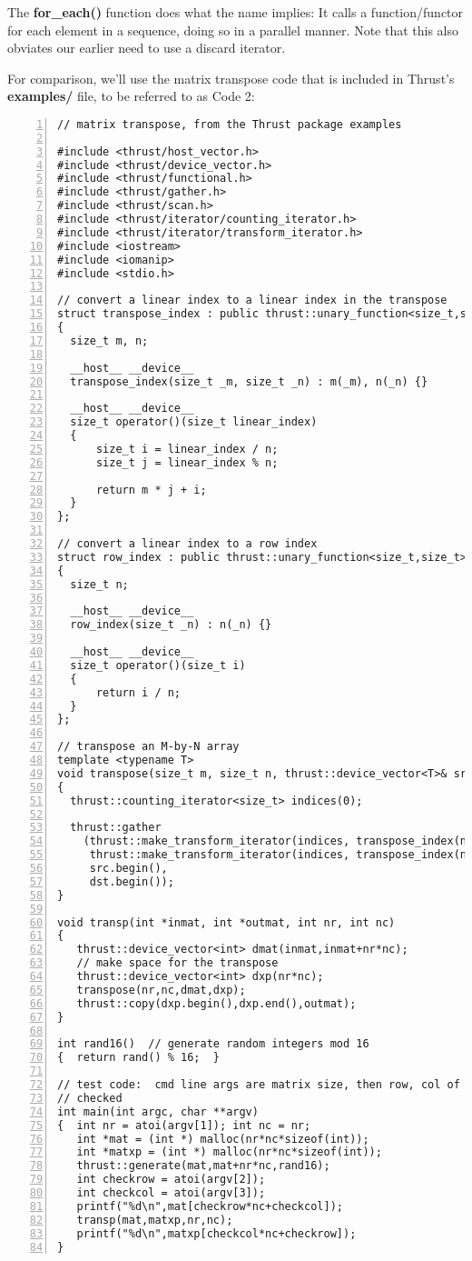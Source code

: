 The {\bf for\_each()} function does what the name implies:  It calls a
function/functor for each element in a sequence, doing so in a parallel
manner.  Note that this also obviates our earlier need to use a discard
iterator.

For comparison, we'll use the matrix transpose code that is included in
Thrust's  {\bf examples/} file, to be referred to as Code 2:

\begin{lstlisting}[numbers=left]
// matrix transpose, from the Thrust package examples

#include <thrust/host_vector.h>
#include <thrust/device_vector.h>
#include <thrust/functional.h>
#include <thrust/gather.h>
#include <thrust/scan.h>
#include <thrust/iterator/counting_iterator.h>
#include <thrust/iterator/transform_iterator.h>
#include <iostream>
#include <iomanip>
#include <stdio.h>

// convert a linear index to a linear index in the transpose 
struct transpose_index : public thrust::unary_function<size_t,size_t>
{
  size_t m, n;

  __host__ __device__
  transpose_index(size_t _m, size_t _n) : m(_m), n(_n) {}

  __host__ __device__
  size_t operator()(size_t linear_index)
  {
      size_t i = linear_index / n;
      size_t j = linear_index % n;

      return m * j + i;
  }
};

// convert a linear index to a row index
struct row_index : public thrust::unary_function<size_t,size_t>
{
  size_t n;

  __host__ __device__
  row_index(size_t _n) : n(_n) {}

  __host__ __device__
  size_t operator()(size_t i)
  {
      return i / n;
  }
};

// transpose an M-by-N array
template <typename T>
void transpose(size_t m, size_t n, thrust::device_vector<T>& src, thrust::device_vector<T>& dst)
{
  thrust::counting_iterator<size_t> indices(0);

  thrust::gather
    (thrust::make_transform_iterator(indices, transpose_index(n, m)),
     thrust::make_transform_iterator(indices, transpose_index(n, m)) + dst.size(),
     src.begin(),
     dst.begin());
}

void transp(int *inmat, int *outmat, int nr, int nc)
{
   thrust::device_vector<int> dmat(inmat,inmat+nr*nc);
   // make space for the transpose
   thrust::device_vector<int> dxp(nr*nc);
   transpose(nr,nc,dmat,dxp);
   thrust::copy(dxp.begin(),dxp.end(),outmat);
}

int rand16()  // generate random integers mod 16
{  return rand() % 16;  }

// test code:  cmd line args are matrix size, then row, col of elt to be
// checked
int main(int argc, char **argv)
{  int nr = atoi(argv[1]); int nc = nr;
   int *mat = (int *) malloc(nr*nc*sizeof(int));
   int *matxp = (int *) malloc(nr*nc*sizeof(int));
   thrust::generate(mat,mat+nr*nc,rand16);
   int checkrow = atoi(argv[2]);
   int checkcol = atoi(argv[3]);
   printf("%d\n",mat[checkrow*nc+checkcol]);
   transp(mat,matxp,nr,nc);
   printf("%d\n",matxp[checkcol*nc+checkrow]);
}
\end{lstlisting}

